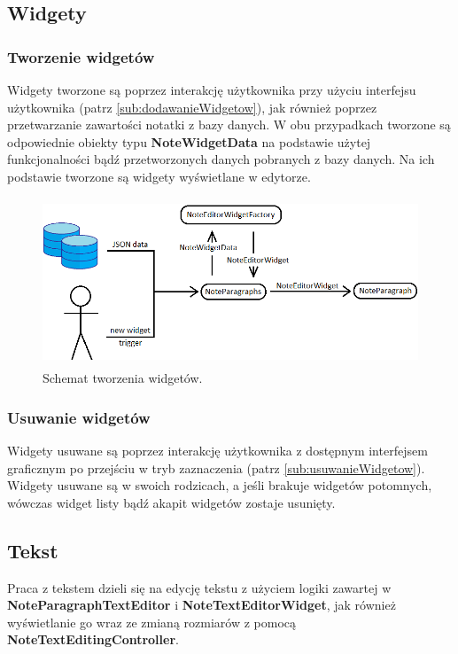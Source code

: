 \subsection{Widgety}

\subsubsection{Tworzenie widgetów}

Widgety tworzone są poprzez interakcję użytkownika przy użyciu interfejsu użytkownika (patrz \ref{sub:dodawanieWidgetow}), jak również poprzez przetwarzanie zawartości notatki z bazy danych. W obu przypadkach tworzone są odpowiednie obiekty typu \textbf{NoteWidgetData} na podstawie użytej funkcjonalności bądź przetworzonych danych pobranych z bazy danych. Na ich podstawie tworzone są widgety wyświetlane w edytorze.

\begin{figure}[ht]
    \centering
    \includegraphics[height=5cm]{images/tworzenie_widgetow.png}
    \caption{Schemat tworzenia widgetów.}
    \label{fig:create-widget}
\end{figure}

\subsubsection{Usuwanie widgetów}

Widgety usuwane są poprzez interakcję użytkownika z dostępnym interfejsem graficznym po przejściu w tryb zaznaczenia (patrz \ref{sub:usuwanieWidgetow}). Widgety usuwane są w swoich rodzicach, a jeśli brakuje widgetów potomnych, wówczas widget listy bądź akapit widgetów zostaje usunięty.

\newpage

\subsection{Tekst}

Praca z tekstem dzieli się na edycję tekstu z użyciem logiki zawartej w \textbf{NoteParagraphTextEditor} i \textbf{NoteTextEditorWidget}, jak również wyświetlanie go wraz ze zmianą rozmiarów z pomocą \textbf{NoteTextEditingController}.

